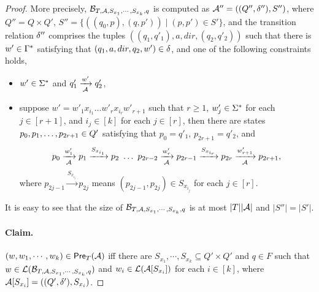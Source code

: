 \begin{proof}
More precisely, $\mathcal{B}_{T, \mathcal{A}, S_{x_1}, \cdots, S_{x_k}, q}$ is computed as
$\mathcal{A}'' = ((Q'', \delta''), S'')$, where $Q'' = Q \times Q'$, $S'' = \{((q_0, p), (q, p')) \mid (p, p') \in S'\}$, and the transition relation $\delta''$ comprises the tuples $((q_1, q'_1), a, dir, (q_2, q'_2))$ such that there is $w' \in \Gamma^*$ satisfying that $(q_1, a, dir, q_2, w') \in \delta$, and one of the following constraints holds, 
\begin{itemize}
\item $w' \in \Sigma^*$  and $q'_1 \xrightarrow[\mathcal{A}]{w'} q'_2$, 
%
\item suppose $w' = w'_1 x_{i_1} \ldots w'_{r} x_{i_{r}} w'_{r+1}$ such that $r \ge 1$, $w'_j \in \Sigma^*$ for each $j \in [r+1]$,  and $i_j \in [k]$ for each $j \in [r]$, then there are states $p_0, p_1, \ldots, p_{2r+1} \in Q'$ satisfying that $p_0 = q'_1$, $p_{2r+1} = q'_2$, and 
$$p_0 \xrightarrow[\mathcal{A}]{w'_1} p_1 \xrightarrow{S_{x_{i_1}}} p_2\ \ldots\ p_{2r-2} \xrightarrow[\mathcal{A}]{w'_r}p_{2r-1} \xrightarrow{S_{x_{i_r}}} p_{2r} \xrightarrow[\mathcal{A}]{w'_{r+1}} p_{2r+1},$$ 
where $p_{2j-1} \xrightarrow{S_{x_{i_j}}} p_{2j}$ means $(p_{2j-1}, p_{2j}) \in S_{x_{i_j}}$ for each $j \in [r]$.
\end{itemize}
%
%
It is easy to see that  the size of $\mathcal{B}_{T, \mathcal{A}, S_{x_1}, \cdots, S_{x_k}, q}$ is at most $|T||\mathcal{A}|$ and $|S''| = |S'|$.   



\paragraph{Claim.} %
$(w, w_1,\cdots, w_k) \in \textsf{Pre}_{T}(\mathcal{A})$ iff there are $S_{x_1}, \cdots, S_{x_k} \subseteq Q' \times Q'$ and $q \in F$ such that $w \in \mathcal{L}(\mathcal{B}_{T, \mathcal{A}, S_{x_1}, \cdots, S_{x_k}, q})$ and $w_i \in \mathcal{L}(\mathcal{A}[S_{x_i}])$ for each $i \in [k]$, where $\mathcal{A}[S_{x_i}]=((Q', \delta'), S_{x_i})$.


\end{proof}
